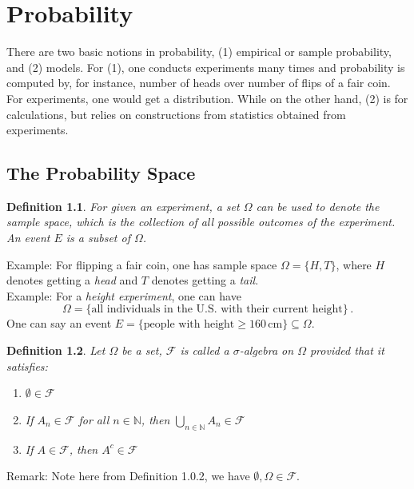\documentclass[11pt, onesided]{book}
\theoremstyle{break}
\theoremstyle{break}
\newtheorem{defn}{Definition}[thm]
\newcommand{\N}{\mathbb{N}}
\newcommand{\remark}{\color{blue}Remark: \color{black}}
\newcommand{\example}{\color{green}Example: \color{black}}
\begin{document}
\tableofcontents
\hfill\break
\hfill\break
\hfill\break
 

\newpage
\chapter{Probability}
\quad There are two basic notions in probability, (1) empirical or sample probability, and (2) models. For (1), one conducts experiments many times and probability is computed by, for instance, number of heads over number of flips of a fair coin. For experiments, one would get a distribution. While on the other hand, (2) is for calculations, but relies on constructions from statistics obtained from experiments. \\

\section[The Probability Space]{\color{red}The Probability Space \color{black}}
\begin{defn}
For given an experiment, a set $\Omega$ can be used to denote the sample space, which is the collection of all possible outcomes of the experiment. An event $E$ is a subset of $\Omega$. 
\end{defn}

\example For flipping a fair coin, one has sample space $\Omega = \{H, T\}$, where $H$ denotes getting a \textit{head} and $T$ denotes getting a \textit{tail}. \\

\example For a \textit{height experiment}, one can have 
$$\Omega=\{\text{all individuals in the U.S. with their current height}\}\, .$$ One can say an event $E= \{ \text{people with height}\geq 160\,\text{cm}\}\subseteq \Omega$. 

\begin{defn}
Let $\Omega$ be a set, $\mathcal{F}$ is called a $\sigma$-algebra on $\Omega$ provided that it satisfies:
\begin{enumerate}[topsep=3pt,itemsep=-1ex,partopsep=1ex,parsep=1ex]
\item $\emptyset \in \mathcal{F}$
\item If $A_n \in \mathcal{F}$ for all $n \in \N$, then $\bigcup_{n\in \N}A_n \in \mathcal{F}$
\item If $A \in \mathcal{F}$, then $A^c \in \mathcal{F}$
\end{enumerate} 
\end{defn}

\remark Note here from Definition 1.0.2, we have $\emptyset, \Omega \in \mathcal{F}$.
\end{document}
